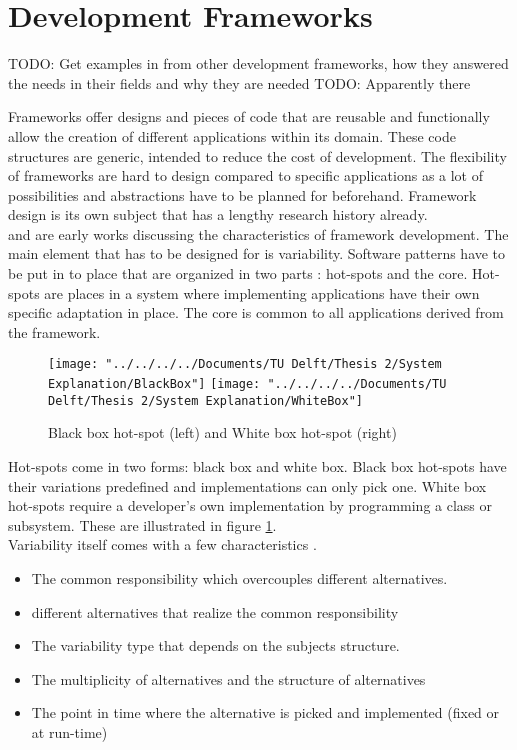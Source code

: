 

\section{Development Frameworks}
TODO: Get examples in from other development frameworks, how they answered the needs in their fields and why they are needed
TODO: Apparently there

Frameworks offer designs and pieces of code that are reusable and functionally allow the creation of different applications within its domain. These code structures are generic, intended to reduce the cost of development. The flexibility of frameworks are hard to design compared to specific applications as a lot of possibilities and abstractions have to be planned for beforehand. Framework design is its own subject that has a lengthy research history already. \\

\cite{schmid1997systematic} and \cite{roberts1996evolving} are early works discussing the characteristics of framework development. The main element that has to be designed for is variability. Software patterns have to be put in to place that are organized in two parts \citep{ben2004uml}: hot-spots and the core. Hot-spots are places in a system where implementing applications have their own specific adaptation in place. The core is common to all applications derived from the framework. \\

\begin{figure}
	\centering
	\texttt{[image: "../../../../Documents/TU Delft/Thesis 2/System Explanation/BlackBox"]}
	\texttt{[image: "../../../../Documents/TU Delft/Thesis 2/System Explanation/WhiteBox"]}	\caption[Black White Box Hot Spot]{Black box hot-spot (left) and White box hot-spot (right)}
	\label{fig:blackbox}
\end{figure}

Hot-spots come in two forms: black box and white box. Black box hot-spots have their variations predefined and implementations can only pick one. White box hot-spots require a developer's own implementation by programming a class or subsystem. These are illustrated in figure \ref{fig:blackbox}.\\

Variability itself comes with a few characteristics \citep{schmid1997systematic}. 
\begin{itemize}
	\item The common responsibility which overcouples different alternatives.
	\item different alternatives that realize the common responsibility
	\item The variability type that depends on the subjects structure.
	\item The multiplicity of alternatives and the structure of alternatives
	\item The point in time where the alternative is picked and implemented (fixed or at run-time)
\end{itemize}

